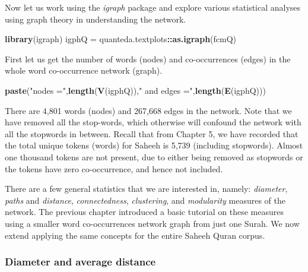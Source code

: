 \documentclass[
]{article}
\newenvironment{Shaded}{\begin{snugshade}}{\end{snugshade}}
\newcommand{\FunctionTok}[1]{\textcolor[rgb]{0.13,0.29,0.53}{\textbf{#1}}}
\newcommand{\NormalTok}[1]{#1}
\newcommand{\OtherTok}[1]{\textcolor[rgb]{0.56,0.35,0.01}{#1}}
\newcommand{\SpecialCharTok}[1]{\textcolor[rgb]{0.81,0.36,0.00}{\textbf{#1}}}
\newcommand{\StringTok}[1]{\textcolor[rgb]{0.31,0.60,0.02}{#1}}
\begin{document}
Now let us work using the \emph{igraph} package and explore various statistical analyses using graph theory in understanding the network.

\footnotesize

\begin{Shaded}
\begin{Highlighting}[]
\FunctionTok{library}\NormalTok{(igraph)}
\NormalTok{igphQ }\OtherTok{=}\NormalTok{ quanteda.textplots}\SpecialCharTok{::}\FunctionTok{as.igraph}\NormalTok{(fcmQ)}
\end{Highlighting}
\end{Shaded}

\normalsize

First let us get the number of words (nodes) and co-occurrences (edges) in the whole word co-occurrence network (graph).

\footnotesize

\begin{Shaded}
\begin{Highlighting}[]
\FunctionTok{paste}\NormalTok{(}\StringTok{"nodes ="}\NormalTok{,}\FunctionTok{length}\NormalTok{(}\FunctionTok{V}\NormalTok{(igphQ)),}\StringTok{" and edges ="}\NormalTok{,}\FunctionTok{length}\NormalTok{(}\FunctionTok{E}\NormalTok{(igphQ)))}
\end{Highlighting}
\end{Shaded}

\normalsize

There are 4,801 words (nodes) and 267,668 edges in the network. Note that we have removed all the stop-words, which otherwise will confound the network with all the stopwords in between. Recall that from Chapter 5, we have recorded that the total unique tokens (words) for Saheeh is 5,739 (including stopwords). Almost one thousand tokens are not present, due to either being removed as stopwords or the tokens have zero co-occurrence, and hence not included.

There are a few general statistics that we are interested in, namely: \emph{diameter}, \emph{paths} and \emph{distance}, \emph{connectedness}, \emph{clustering}, and \emph{modularity} measures of the network. The previous chapter introduced a basic tutorial on these measures using a smaller word co-occurrences network graph from just one Surah. We now extend applying the same concepts for the entire Saheeh Quran corpus.

\hypertarget{diameter-and-average-distance}{%
\subsubsection{Diameter and average distance}\label{diameter-and-average-distance}}
\end{document}
